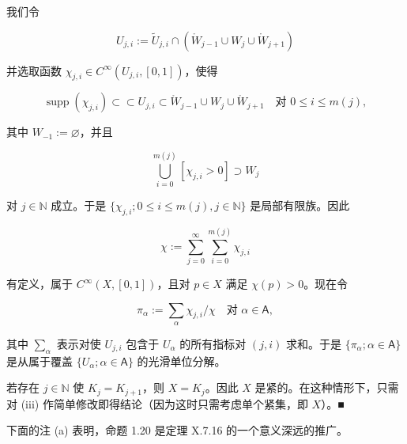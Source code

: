 \begin{proposition}

我们令

\[
U_{j,i} := \widetilde{U}_{j,i} \cap (\mathring{W}_{j-1} \cup W_{j} \cup \mathring{W}_{j+1})
\]

并选取函数 $ \chi_{j,i} \in C^{\infty}(U_{j,i}, [0, 1]) $，使得

\[
\operatorname{supp}(\chi_{j,i}) \subset\subset U_{j,i} \subset \mathring{W}_{j-1} \cup W_{j} \cup \mathring{W}_{j+1} \quad \text{对 } 0 \le i \le m(j),
\]

其中 $ W_{-1} := \varnothing $，并且

\[
\bigcup_{i=0}^{m(j)} [\chi_{j,i} > 0] \supset W_j
\]

对 $ j \in \mathbb{N} $ 成立。于是 $ \{\chi_{j,i}; 0 \le i \le m(j), j \in \mathbb{N}\} $ 是局部有限族。因此

\[
\chi := \sum_{j=0}^{\infty} \sum_{i=0}^{m(j)} \chi_{j,i}
\]

有定义，属于 $ C^{\infty}(X, [0,1]) $，且对 $ p \in X $ 满足 $ \chi(p) > 0 $。现在令

\[
\pi_{\alpha} := \sum_{\alpha} \chi_{j,i}/\chi \quad \text{对 } \alpha \in \mathsf{A},
\]

其中 $ \sum_{\alpha} $ 表示对使 $ U_{j,i} $ 包含于 $ U_{\alpha} $ 的所有指标对 $ (j,i) $ 求和。于是 $ \{\pi_{\alpha}; \alpha \in \mathsf{A}\} $ 是从属于覆盖 $ \{U_{\alpha}; \alpha \in \mathsf{A}\} $ 的光滑单位分解。

\begin{subitems}
\item[（iv）]

若存在 $ j \in \mathbb{N} $ 使 $ K_j = K_{j+1} $，则 $ X = K_j $。因此 $ X $ 是紧的。在这种情形下，只需对 (iii) 作简单修改即得结论（因为这时只需考虑单个紧集，即 $ X $）。\nobreak\hspace{0.35em}■

\end{subitems}

\end{proposition}

下面的注 (a) 表明，命题 1.20 是定理 X.7.16 的一个意义深远的推广。

